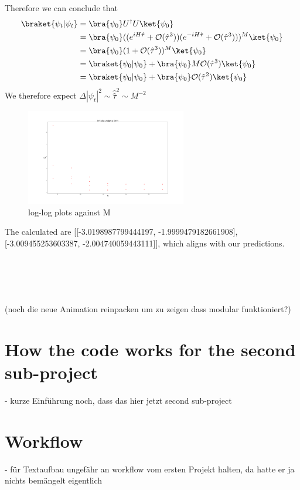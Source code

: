 \documentclass[11pt, letterpaper, onecolumn]{article}
\begin{document}
Therefore we can conclude that
\begin{align*}
    \braket{\psi_t|\psi_t}&=\bra{\psi_0}U^\dagger U\ket{\psi_0}\\
    &=\bra{\psi_0}((e^{iH\hat{\tau}}+\mathcal{O}(\hat{\tau}^3))(e^{-iH\hat{\tau}}+\mathcal{O}(\hat{\tau}^3)))^M\ket{\psi_0}\\
    &=\bra{\psi_0}(1+\mathcal{O}(\hat{\tau}^3))^M\ket{\psi_0}\\
    &=\braket{\psi_0|\psi_0}+\bra{\psi_0}M\mathcal{O}(\hat{\tau}^3)\ket{\psi_0}\\
    &=\braket{\psi_0|\psi_0}+\bra{\psi_0}\mathcal{O}(\hat{\tau}^2)\ket{\psi_0}
\end{align*}
We therefore expect $\Delta|\psi_t|^2\sim\hat{\hat{\tau}}^2\sim M^{-2}$
	\begin{figure} [h] 
	\begin{center}
	\includegraphics[width=7cm]{"inf_vol_lim.png"}
	\caption{log-log plots against M}
	\end{center}
	\end{figure}
	The calculated are [[-3.0198987799444197, -1.9999479182661908], [-3.009455253603387, -2.004740059443111]], which aligns with our predictions.
	

	\\
 	\\
  	\\
   	\\
 	(noch die neue Animation reinpacken um zu zeigen dass modular funktioniert?)




	\newpage
   
	\section{How the code works for the second sub-project}	
	- kurze Einführung noch, dass das hier jetzt second sub-project
	
	
	
	\section{Workflow}
	- für Textaufbau ungefähr an workflow vom ersten Projekt halten, da hatte er ja nichts bemängelt eigentlich
	
\end{document}
